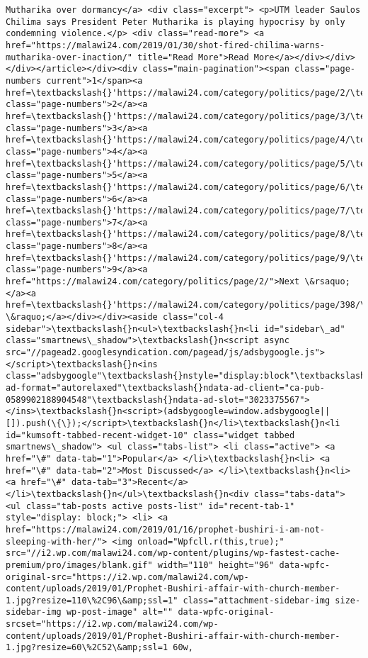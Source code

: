 \documentclass[11pt]{article}
\begin{document}
\begin{Verbatim}[commandchars=\\\{\}]
Mutharika over dormancy</a> <div class="excerpt"> <p>UTM leader Saulos Chilima says President Peter Mutharika is playing hypocrisy by only condemning violence.</p> <div class="read-more"> <a href="https://malawi24.com/2019/01/30/shot-fired-chilima-warns-mutharika-over-inaction/" title="Read More">Read More</a></div></div></div></article></div><div class="main-pagination"><span class="page-numbers current">1</span><a href=\textbackslash{}'https://malawi24.com/category/politics/page/2/\textbackslash{}' class="page-numbers">2</a><a href=\textbackslash{}'https://malawi24.com/category/politics/page/3/\textbackslash{}' class="page-numbers">3</a><a href=\textbackslash{}'https://malawi24.com/category/politics/page/4/\textbackslash{}' class="page-numbers">4</a><a href=\textbackslash{}'https://malawi24.com/category/politics/page/5/\textbackslash{}' class="page-numbers">5</a><a href=\textbackslash{}'https://malawi24.com/category/politics/page/6/\textbackslash{}' class="page-numbers">6</a><a href=\textbackslash{}'https://malawi24.com/category/politics/page/7/\textbackslash{}' class="page-numbers">7</a><a href=\textbackslash{}'https://malawi24.com/category/politics/page/8/\textbackslash{}' class="page-numbers">8</a><a href=\textbackslash{}'https://malawi24.com/category/politics/page/9/\textbackslash{}' class="page-numbers">9</a><a href="https://malawi24.com/category/politics/page/2/">Next \&rsaquo;</a><a href=\textbackslash{}'https://malawi24.com/category/politics/page/398/\textbackslash{}'>Last \&raquo;</a></div></div><aside class="col-4 sidebar">\textbackslash{}n<ul>\textbackslash{}n<li id="sidebar\_ad" class="smartnews\_shadow">\textbackslash{}n<script async src="//pagead2.googlesyndication.com/pagead/js/adsbygoogle.js"></script>\textbackslash{}n<ins class="adsbygoogle"\textbackslash{}nstyle="display:block"\textbackslash{}ndata-ad-format="autorelaxed"\textbackslash{}ndata-ad-client="ca-pub-0589902188904548"\textbackslash{}ndata-ad-slot="3023375567"></ins>\textbackslash{}n<script>(adsbygoogle=window.adsbygoogle||[]).push(\{\});</script>\textbackslash{}n</li>\textbackslash{}n<li id="kumsoft-tabbed-recent-widget-10" class="widget tabbed smartnews\_shadow"> <ul class="tabs-list"> <li class="active"> <a href="\#" data-tab="1">Popular</a> </li>\textbackslash{}n<li> <a href="\#" data-tab="2">Most Discussed</a> </li>\textbackslash{}n<li> <a href="\#" data-tab="3">Recent</a> </li>\textbackslash{}n</ul>\textbackslash{}n<div class="tabs-data"> <ul class="tab-posts active posts-list" id="recent-tab-1" style="display: block;"> <li> <a href="https://malawi24.com/2019/01/16/prophet-bushiri-i-am-not-sleeping-with-her/"> <img onload="Wpfcll.r(this,true);" src="//i2.wp.com/malawi24.com/wp-content/plugins/wp-fastest-cache-premium/pro/images/blank.gif" width="110" height="96" data-wpfc-original-src="https://i2.wp.com/malawi24.com/wp-content/uploads/2019/01/Prophet-Bushiri-affair-with-church-member-1.jpg?resize=110\%2C96\&amp;ssl=1" class="attachment-sidebar-img size-sidebar-img wp-post-image" alt="" data-wpfc-original-srcset="https://i2.wp.com/malawi24.com/wp-content/uploads/2019/01/Prophet-Bushiri-affair-with-church-member-1.jpg?resize=60\%2C52\&amp;ssl=1 60w, 
\end{Verbatim}
\end{document}
